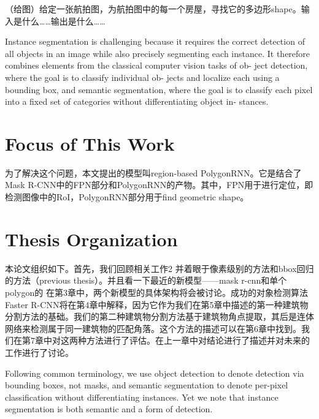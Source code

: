 （给图）给定一张航拍图，为航拍图中的每一个房屋，寻找它的多边形shape。输入是什么……输出是什么……

Instance segmentation is challenging because it requires the correct detection of all objects in an image while also precisely segmenting each instance. It therefore combines elements from the classical computer vision tasks of ob- ject detection, where the goal is to classify individual ob- jects and localize each using a bounding box, and semantic segmentation, where the goal is to classify each pixel into a fixed set of categories without differentiating object in- stances.
\section{Focus of This Work}\label{fcswrk}

为了解决这个问题，本文提出的模型叫region-based PolygonRNN。它是结合了Mask R-CNN中的FPN部分和PolygonRNN的产物。其中，FPN用于进行定位，即检测图像中的RoI，PolygonRNN部分用于find geometric shape。

\section{Thesis Organization}\label{thsorg}

本论文组织如下。首先，我们回顾相关工作2 并着眼于像素级别的方法和bbox回归的方法（previous thesis）。并且看一下最近的新模型——mask r-cnn和单个polygon的
在第3章中，两个新模型的具体架构将会被讨论。成功的对象检测算法Faster R-CNN将在第4章中解释，因为它作为我们在第5章中描述的第一种建筑物分割方法的基础。我们的第二种建筑物分割方法基于建筑物角点提取，其后是连体网络来检测属于同一建筑物的匹配角落。这个方法的描述可以在第6章中找到。我们在第7章中对这两种方法进行了评估。在上一章中对结论进行了描述并对未来的工作进行了讨论。

Following common terminology, we use object detection to denote detection via bounding boxes, not masks, and semantic segmentation to denote per-pixel classification without differentiating instances. Yet we note that instance segmentation is both semantic and a form of detection.
